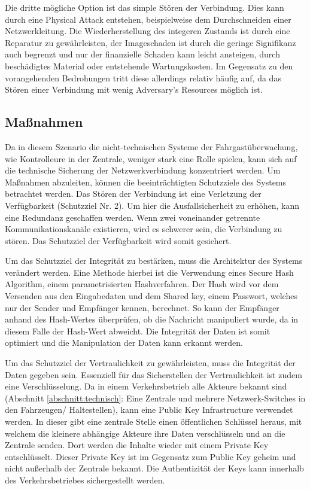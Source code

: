 Die dritte mögliche Option ist das simple Stören der Verbindung. Dies kann durch eine \glqq{}Physical Attack\grqq{} entstehen, beispielweise dem Durchschneiden einer Netzwerkleitung. Die Wiederherstellung des
integeren Zustands ist durch eine Reparatur zu gewährleisten, der Imageschaden ist durch die geringe Signifikanz auch begrenzt und nur der finanzielle Schaden kann leicht ansteigen, durch beschädigtes Material
oder entstehende Wartungskosten. Im Gegensatz zu den vorangehenden Bedrohungen tritt diese allerdings relativ häufig auf, da das Stören einer Verbindung mit wenig \glqq{}Adversary's Resources\grqq{} möglich ist.

\subsection{Maßnahmen}
Da in diesem Szenario die nicht-technischen Systeme der Fahrgastüberwachung, wie Kontrolleure in der Zentrale, weniger stark eine Rolle spielen, kann sich auf die technische Sicherung der Netzwerkverbindung konzentriert werden.
Um Maßnahmen abzuleiten, können die beeinträchtigten Schutzziele des Systems betrachtet werden. Das Stören der Verbindung ist eine Verletzung der Verfügbarkeit (Schutzziel Nr. 2). Um hier die Ausfallsicherheit
zu erhöhen, kann eine Redundanz geschaffen werden. Wenn zwei voneinander getrennte Kommunikationskanäle existieren, wird es schwerer sein,
die Verbindung zu stören. Das Schutzziel der Verfügbarkeit wird somit gesichert.

Um das Schutzziel der Integrität zu bestärken, muss die Architektur des Systems verändert werden. Eine Methode hierbei ist die Verwendung eines \glqq{}Secure Hash Algorithm\grqq{}, einem parametrisierten Hashverfahren.
Der Hash wird vor dem Versenden aus den Eingabedaten und dem Shared key, einem Passwort, welches nur der Sender und Empfänger kennen, berechnet. So kann der Empfänger anhand des Hash-Wertes überprüfen,
ob die Nachricht manipuliert wurde, da in diesem Falle der Hash-Wert abweicht. Die Integrität der Daten ist somit optimiert und die Manipulation der Daten kann erkannt werden.

Um das Schutzziel der Vertraulichkeit zu gewährleisten, muss die Integrität der Daten gegeben sein. Essenziell für das Sicherstellen der Vertraulichkeit ist zudem eine Verschlüsselung. Da in einem Verkehrsbetrieb alle Akteure
bekannt sind (Abschnitt \ref{abschnitt:technisch}: Eine Zentrale und mehrere Netzwerk-Switches in den Fahrzeugen/ Haltestellen), kann eine \glqq{}Public Key Infrastructure\grqq{} verwendet werden. In dieser gibt
eine zentrale Stelle einen öffentlichen Schlüssel heraus, mit welchem die kleinere abhängige Akteure ihre Daten verschlüsseln und an die Zentrale senden. Dort werden die Inhalte wieder mit einem Private Key entschlüsselt.
Dieser Private Key ist im Gegensatz zum Public Key geheim und nicht außerhalb der Zentrale bekannt. Die Authentizität der Keys kann innerhalb des Verkehrsbetriebes sichergestellt werden.